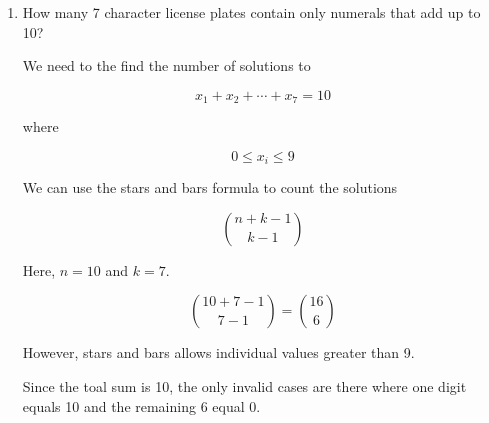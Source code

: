 \documentclass{article}
\begin{document}
\begin{enumerate}
\begin{enumerate}
\[
N = \text{Plates without a numeral}
\]

We want a plate containing at least one A, one B, and one numeral.

We use the complement and the inclusion-exclusion principle. There are $36^7$ possible plates. The individual sets have sizes 

\[
|A| = 35^7, \qquad |B| = 35^7
\]

\[
|N| = 26^7
\]

Their pairwise intersections are 

\[
|A \cap B| = 34^7
\]

\[
|A \cap N| = 25^7
\]

\[
|B \cap N| = 25^7
\]

The interesection of all three sets is 

\[
|A \cap B \cap N| = 24^7
\]

Using inclusion-exclsuion

\begin{align*}
|A \cup B \cup N|
&= |A| + |B| +|N|\\
&\quad - |A \cap B|\\
&\quad - |A \cap N|\\
&\quad - |B \cap N|\\
&\quad + |A \cap B \cap N|
\end{align*}

We subtract this from the total possibilites:

\[
\boxed{
36^7 -
\left(
2(35^7) + 26^7
- 34^7 - 2(25^7) + 24^7
\right)
}
\]

\item How many 7 character license plates contain only numerals that add up to 10?

We need to the find the number of solutions to 

\[
x_1 + x_2 + \cdots + x_7 = 10
\]

where 

\[
0 \leq x_i \leq 9
\]

We can use the stars and bars formula to count the solutions

\[
\binom{n+k-1}{k-1}
\]

Here, $n=10$ and $k=7$.

\[
\binom{10+7-1}{7-1} 
=
\binom{16}{6}
\]

However, stars and bars allows individual values greater than 9. 

Since the toal sum is 10, the only invalid cases are there where one digit equals 10
and the remaining 6 equal 0.


\end{enumerate}
\end{enumerate}
\end{document}
